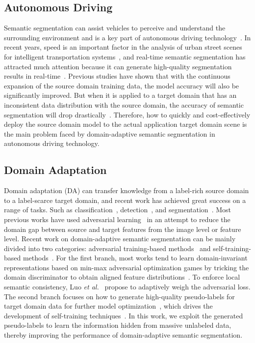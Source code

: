 \documentclass[journal]{IEEEtran}
\newcommand{\etal}{\textit{et al.}}
\begin{document}
\subsection{Autonomous Driving}
Semantic segmentation can assist vehicles to perceive and understand the surrounding environment and is a key part of autonomous driving technology~\cite{9529067}. In recent years, speed is an important factor in the analysis of urban street scenes for intelligent transportation systems~\cite{9619854}, and real-time semantic segmentation has attracted much attention because it can generate high-quality segmentation results in real-time~\cite{9042876, 9134735}. Previous studies have shown that with the continuous expansion of the source domain training data, the model accuracy will also be significantly improved. But when it is applied to a target domain that has an inconsistent data distribution with the source domain, the accuracy of semantic segmentation will drop drastically~\cite{10021219}. Therefore, how to quickly and cost-effectively deploy the source domain model to the actual application target domain scene is the main problem faced by domain-adaptive semantic segmentation in autonomous driving technology.


\subsection{Domain Adaptation}
Domain adaptation (DA) can transfer knowledge from a label-rich source domain to a label-scarce target domain, and recent work has achieved great success on a range of tasks. Such as classification~\cite{li2021transferable}, detection~\cite{vs2021mega}, and segmentation~\cite{liu2021source}. Most previous works have used adversarial learning~\cite{vu2019advent, wang2020differential} in an attempt to reduce the domain gap between source and target features from the image level or feature level. Recent work on domain-adaptive semantic segmentation can be mainly divided into two categories: adversarial training-based methods~\cite{vu2019advent, wang2020classes} and self-training-based methods~\cite{zou2019confidence, zheng2021rectifying, zhang2021prototypical}. For the first branch, most works tend to learn domain-invariant representations based on min-max adversarial optimization games by tricking the domain discriminator to obtain aligned feature distributions~\cite{vu2019advent, wang2020classes}. To enforce local semantic consistency, Luo \etal~\cite{luo2019taking} propose to adaptively weigh the adversarial loss. The second branch focuses on how to generate high-quality pseudo-labels for target domain data for further model optimization~\cite{zheng2021rectifying, zhang2021prototypical}, which drives the development of self-training techniques~\cite{saito2019semi, chen2021semi}. In this work, we exploit the generated pseudo-labels to learn the information hidden from massive unlabeled data, thereby improving the performance of domain-adaptive semantic segmentation.
\end{document}
